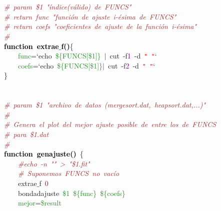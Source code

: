 \mbox{} \\
\mbox{} \\
\mbox{}\textit{\textcolor{Brown}{\#\ param\ \$1\ "{}índice(válido)\ de\ FUNCS"{}}} \\
\mbox{}\textit{\textcolor{Brown}{\#\ return\ func\ "{}función\ de\ ajuste\ i-ésima\ de\ FUNCS"{}}} \\
\mbox{}\textit{\textcolor{Brown}{\#\ return\ coefs\ "{}coeficientes\ de\ ajuste\ de\ la\ función\ i-ésima"{}}} \\
\mbox{}\textit{\textcolor{Brown}{\#}} \\
\mbox{}\textbf{\textcolor{Black}{function\ extrae$\_$f()}}\{ \\
\mbox{}\ \ \ \ \textcolor{ForestGreen}{func}\textcolor{BrickRed}{=}`echo\ \textcolor{ForestGreen}{\$\{FUNCS[\$1]\}}\ \textcolor{BrickRed}{$|$}\ cut\ -f\textcolor{Purple}{1}\ -d\ \texttt{\textcolor{Red}{"{}\ "{}}}` \\
\mbox{}\ \ \ \ \textcolor{ForestGreen}{coefs}\textcolor{BrickRed}{=}`echo\ \textcolor{ForestGreen}{\$\{FUNCS[\$1]\}}\textcolor{BrickRed}{$|$}\ cut\ -f\textcolor{Purple}{2}\ -d\ \texttt{\textcolor{Red}{"{}\ "{}}}` \\
\mbox{}\}\ \ \ \  \\
\mbox{} \\
\mbox{} \\
\mbox{}\textit{\textcolor{Brown}{\#\ param\ \$1\ "{}archivo\ de\ datos\ (mergesort.dat,\ heapsort.dat,...)"{}}} \\
\mbox{}\textit{\textcolor{Brown}{\#\ }} \\
\mbox{}\textit{\textcolor{Brown}{\#\ Genera\ el\ plot\ del\ mejor\ ajuste\ posible\ de\ entre\ los\ de\ FUNCS}} \\
\mbox{}\textit{\textcolor{Brown}{\#\ para\ \$1.dat}} \\
\mbox{}\textit{\textcolor{Brown}{\#}} \\
\mbox{}\textbf{\textcolor{Black}{function\ genajuste()}}\ \{ \\
\mbox{}\ \ \ \ \textit{\textcolor{Brown}{\#echo\ -n\ "{}"{}\ \textgreater{}\ "{}\$1.fit"{}}} \\
\mbox{}\ \ \ \ \textit{\textcolor{Brown}{\#\ Suponemos\ FUNCS\ no\ vacío}} \\
\mbox{}\ \ \ \ extrae$\_$f\ \textcolor{Purple}{0} \\
\mbox{}\ \ \ \ bondadajuste\ \textcolor{ForestGreen}{\$1}\ \textcolor{ForestGreen}{\$\{func\}}\ \textcolor{ForestGreen}{\$\{coefs\}} \\
\mbox{}\ \ \ \ \textcolor{ForestGreen}{mejor}\textcolor{BrickRed}{=}\textcolor{ForestGreen}{\$result} \\
